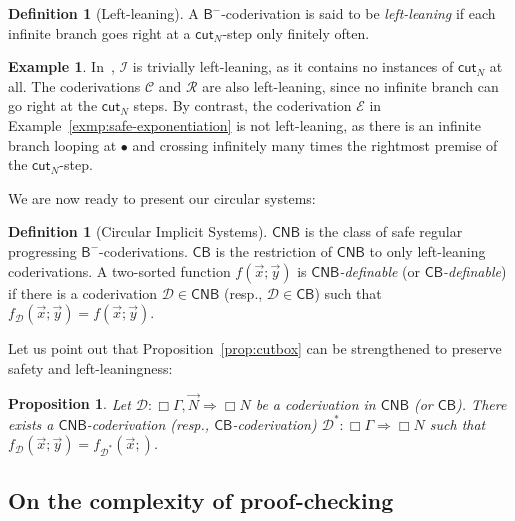 \documentclass[manuscript,screen]{acmart}
\newtheorem{prop}[thm]{Proposition}
\theoremstyle{definition}
\newtheorem{defn}[thm]{Definition}
\newtheorem{exmp}[thm]{Example}
\theoremstyle{remark}
\newcommand{\n}{N}
\newcommand{\sq}{\Box}
\newcommand{\sqn}{{\sq\n}}
\newcommand{\sn}{\sqn}
\newcommand{\model}[1]{\denot{#1}}
\newcommand{\denot}[1]{f_{#1}}
\newcommand{\sexp}{\mathcal{E}}
\newcommand{\cconc}{\mathcal{C}}
\newcommand{\incrementation}{\mathcal{I}}
\newcommand{\primrec}{\mathcal{R}}
\newcommand{\bc}{\mathsf{B}}
\newcommand{\bcnorec}{\bc^{-}}
\newcommand{\nested}{\mathsf{N}}
\newcommand{\seqar}{\Rightarrow}
\newcommand{\der}{\mathcal{D}}
\newcommand{\cut}{\mathsf{cut}}
\newcommand{\cyclic}{\mathsf{C}}
\newcommand{\cbc}{\cyclic\bc}
\newcommand{\ncbc}{\cyclic\nested\bc}
\begin{document}
 

\begin{defn}
[Left-leaning]
\label{defn:left-leaning}
A $\bcnorec$-coderivation is said to be \emph{left-leaning} if each infinite branch goes right at a $\cut_\n$-step only finitely often.
\end{defn}
\begin{exmp}
In~, $\incrementation$ is trivially left-leaning, as it contains no instances of $\cut_\n$ at all. The  coderivations $\cconc$  and $\primrec$ are also left-leaning, since no  infinite branch can go right at the $\cut_\n$ steps. By contrast, the coderivation $\sexp$ in Example~\ref{exmp:safe-exponentiation} is not left-leaning, as there is an infinite branch looping at $\bullet$ and crossing infinitely many times the rightmost premise of the $\cut_\n$-step.
\end{exmp}


We are now ready to present our circular systems:
\begin{defn}
[Circular Implicit Systems]
\label{defn:cyclic-systems}
$\ncbc$ is the class of safe regular progressing $\bcnorec$-coderivations. 
$\cbc$ is the restriction of $\ncbc$ to only left-leaning coderivations. 
A two-sorted function $f(\vec x;\vec y)$ is \emph{$\ncbc$-definable} (or \emph{$\cbc$-definable}) if there is a coderivation $\der\in \ncbc$ (resp., $\der \in \cbc$) such that $\denot \der (\vec x;\vec y) = f(\vec x;\vec y)$.
\end{defn}


Let us point out that Proposition~\ref{prop:cutbox} can be strengthened to preserve safety and left-leaningness:

\begin{prop} \label{prop:cutbox-for-left-leaning} Let    $\der: \sq \Gamma , \vec \n \seqar \sn$ be a  coderivation in $\ncbc$ (or $\cbc$). There exists a $\ncbc$-coderivation (resp., $\cbc$-coderivation) $\der^*:\sq\Gamma \seqar \sn$  such that
\(
    \model{\der}(\vec{x}; \vec{y})= \model{\der^*}(\vec{x};)
\).
\end{prop}






\subsection{On the complexity of proof-checking}
\end{document}
